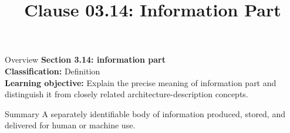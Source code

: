 \documentclass[10pt,letterpaper]{article}
\title{Clause 03.14: Information Part}
\author{}
\date{}
\begin{document}
\maketitle
\begin{CornellOverviewBox}{Overview}
{\Large\bfseries\textcolor{CNavy}{Section 3.14: information part}}\\[3pt]
{\small\textbf{Classification:} Definition}\\
{\small\textbf{Learning objective:} Explain the precise meaning of information part and distinguish it from closely related architecture-description concepts.}
\end{CornellOverviewBox}
\vspace{3pt}

\begin{CornellNotesTable}
\end{CornellNotesTable}


\begin{CornellSummaryBox}{Summary}
A separately identifiable body of information produced, stored, and delivered for human or machine use.
\end{CornellSummaryBox}
\end{document}
